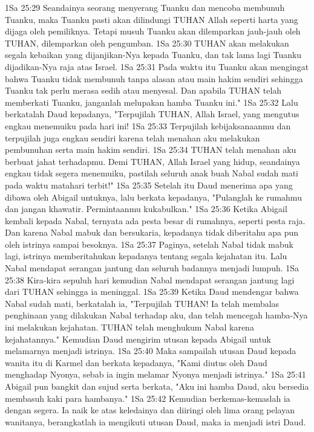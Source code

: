 1Sa 25:29  Seandainya seorang menyerang Tuanku dan mencoba membunuh Tuanku, maka Tuanku pasti akan dilindungi TUHAN Allah seperti harta yang dijaga oleh pemiliknya. Tetapi musuh Tuanku akan dilemparkan jauh-jauh oleh TUHAN, dilemparkan oleh pengumban.
1Sa 25:30  TUHAN akan melakukan segala kebaikan yang dijanjikan-Nya kepada Tuanku, dan tak lama lagi Tuanku dijadikan-Nya raja atas Israel.
1Sa 25:31  Pada waktu itu Tuanku akan mengingat bahwa Tuanku tidak membunuh tanpa alasan atau main hakim sendiri sehingga Tuanku tak perlu merasa sedih atau menyesal. Dan apabila TUHAN telah memberkati Tuanku, janganlah melupakan hamba Tuanku ini."
1Sa 25:32  Lalu berkatalah Daud kepadanya, "Terpujilah TUHAN, Allah Israel, yang mengutus engkau menemuiku pada hari ini!
1Sa 25:33  Terpujilah kebijaksanaanmu dan terpujilah juga engkau sendiri karena telah menahan aku melakukan pembunuhan serta main hakim sendiri.
1Sa 25:34  TUHAN telah menahan aku berbuat jahat terhadapmu. Demi TUHAN, Allah Israel yang hidup, seandainya engkau tidak segera menemuiku, pastilah seluruh anak buah Nabal sudah mati pada waktu matahari terbit!"
1Sa 25:35  Setelah itu Daud menerima apa yang dibawa oleh Abigail untuknya, lalu berkata kepadanya, "Pulanglah ke rumahmu dan jangan khawatir. Permintaanmu kukabulkan."
1Sa 25:36  Ketika Abigail kembali kepada Nabal, ternyata ada pesta besar di rumahnya, seperti pesta raja. Dan karena Nabal mabuk dan bersukaria, kepadanya tidak diberitahu apa pun oleh istrinya sampai besoknya.
1Sa 25:37  Paginya, setelah Nabal tidak mabuk lagi, istrinya memberitahukan kepadanya tentang segala kejahatan itu. Lalu Nabal mendapat serangan jantung dan seluruh badannya menjadi lumpuh.
1Sa 25:38  Kira-kira sepuluh hari kemudian Nabal mendapat serangan jantung lagi dari TUHAN sehingga ia meninggal.
1Sa 25:39  Ketika Daud mendengar bahwa Nabal sudah mati, berkatalah ia, "Terpujilah TUHAN! Ia telah membalas penghinaan yang dilakukan Nabal terhadap aku, dan telah mencegah hamba-Nya ini melakukan kejahatan. TUHAN telah menghukum Nabal karena kejahatannya." Kemudian Daud mengirim utusan kepada Abigail untuk melamarnya menjadi istrinya.
1Sa 25:40  Maka sampailah utusan Daud kepada wanita itu di Karmel dan berkata kepadanya, "Kami diutus oleh Daud menghadap Nyonya, sebab ia ingin melamar Nyonya menjadi istrinya."
1Sa 25:41  Abigail pun bangkit dan sujud serta berkata, "Aku ini hamba Daud, aku bersedia membasuh kaki para hambanya."
1Sa 25:42  Kemudian berkemas-kemaslah ia dengan segera. Ia naik ke atas keledainya dan diiringi oleh lima orang pelayan wanitanya, berangkatlah ia mengikuti utusan Daud, maka ia menjadi istri Daud.
